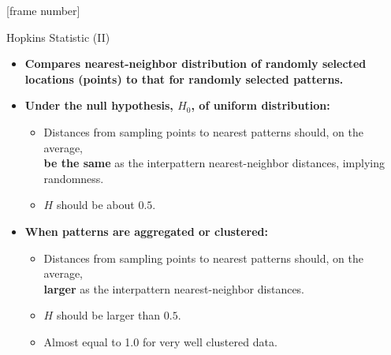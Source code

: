 \documentclass[aspectratio=169,t,xcolor=dvipsnames]{beamer}
\begin{document}
  {
    [frame number]
    \begin{frame}{Hopkins Statistic (II)}
        \begin{itemize}
          \item \textbf{Compares nearest-neighbor distribution of randomly selected locations (points) to that for randomly selected patterns.}
          \item \textbf{Under the null hypothesis, $H_0$, of uniform distribution:}
          \begin{itemize}
            \item Distances from sampling points to nearest patterns should, on the average,\\ \textbf{\color{airforceblue}be the same} as the interpattern nearest-neighbor distances, implying randomness.
            \item $H$ should be about $0.5$.
          \end{itemize}
          \item \textbf{When patterns are aggregated or clustered:}
          \begin{itemize}
            \item Distances from sampling points to nearest patterns should, on the average,\\ \textbf{\color{airforceblue}larger} as the interpattern nearest-neighbor distances.
            \item $H$ should be larger than $0.5$.
            \item Almost equal to 1.0 for very well clustered data.
          \end{itemize}
        \end{itemize}
    \end{frame}
  }
\end{document}
